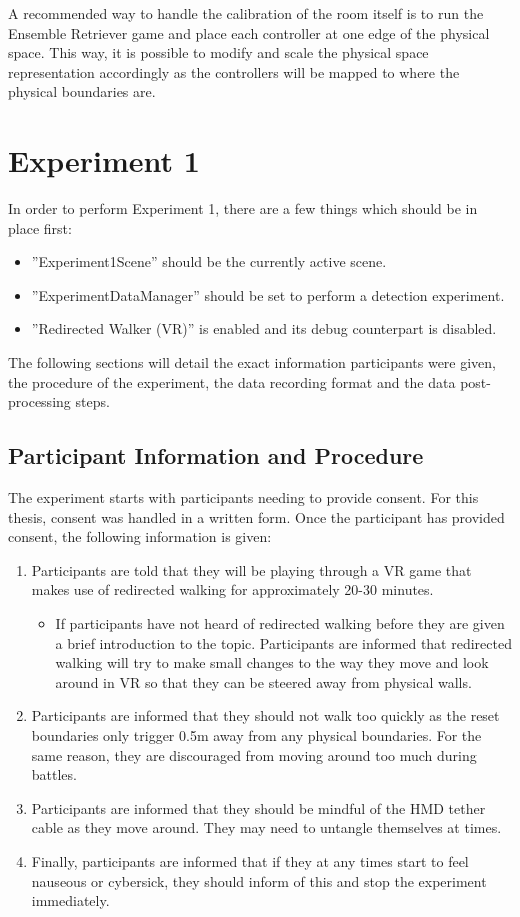 A recommended way to handle the calibration of the room itself is to run the Ensemble Retriever game and place each controller at one edge of the physical space. This way, it is possible to modify and scale the physical space representation accordingly as the controllers will be mapped to where the physical boundaries are. 

\section{Experiment 1}
In order to perform Experiment 1, there are a few things which should be in place first:

\begin{itemize}
    \item ''Experiment1Scene'' should be the currently active scene.
    \item ''ExperimentDataManager'' should be set to perform a detection experiment.
    \item ''Redirected Walker (VR)'' is enabled and its debug counterpart is disabled.
\end{itemize}

The following sections will detail the exact information participants were given, the procedure of the experiment, the data recording format and the data post-processing steps.

\subsection{Participant Information and Procedure}\label{sec:ex1information}
The experiment starts with participants needing to provide consent. For this thesis, consent was handled in a written form. Once the participant has provided consent, the following information is given:

\begin{enumerate}
    \item Participants are told that they will be playing through a VR game that makes use of redirected walking for approximately 20-30 minutes. 
    \begin{itemize}
        \item If participants have not heard of redirected walking before they are given a brief introduction to the topic. Participants are informed that redirected walking will try to make small changes to the way they move and look around in VR so that they can be steered away from physical walls. 
    \end{itemize}  
    \item Participants are informed that they should not walk too quickly as the reset boundaries only trigger 0.5m away from any physical boundaries. For the same reason, they are discouraged from moving around too much during battles.
    \item Participants are informed that they should be mindful of the HMD tether cable as they move around. They may need to untangle themselves at times.
    \item Finally, participants are informed that if they at any times start to feel nauseous or cybersick, they should inform of this and stop the experiment immediately. 
\end{enumerate}

